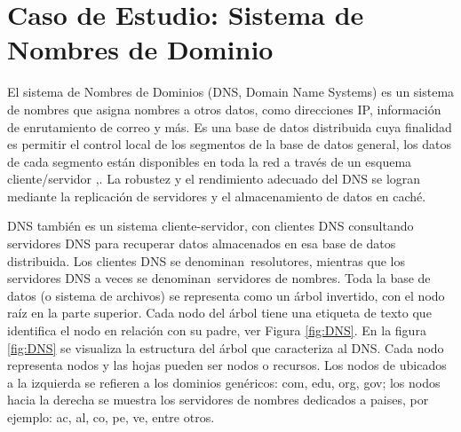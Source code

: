 
\section{Caso de Estudio: Sistema de Nombres de Dominio}
\label{cap:DNS}

El sistema de Nombres de Dominios (DNS, Domain Name Systems)  es un sistema de nombres que asigna nombres a otros datos, como direcciones IP, información de enrutamiento de correo y más. Es una base de datos distribuida  cuya finalidad es  permitir el control local de los segmentos de la base de datos general, los datos de cada segmento están disponibles en toda la red a través de un esquema cliente/servidor   ,.  La robustez y el rendimiento  adecuado del DNS se logran mediante la replicación de servidores  y el almacenamiento de datos en caché. 

DNS también es un sistema cliente-servidor, con clientes DNS consultando servidores DNS para recuperar datos almacenados en esa base de datos distribuida. Los clientes DNS  se denominan \gls{resolutores}, mientras que los servidores DNS a veces se denominan \gls{servidores de nombres}.
Toda la base de datos (o sistema de archivos) se representa como un árbol invertido, con el nodo raíz en la parte superior. Cada nodo del árbol tiene una etiqueta de texto que identifica el nodo en relación con su padre, ver Figura \ref{fig:DNS}.
En la figura \ref{fig:DNS} se visualiza la estructura del árbol que caracteriza al DNS. Cada nodo representa nodos y las hojas pueden ser nodos o recursos. Los nodos de ubicados a la izquierda se refieren a los dominios genéricos: com, edu, org, gov; los nodos hacia la derecha se muestra los servidores de nombres dedicados a paises, por ejemplo: ac, al, co, pe, ve, entre otros. 

